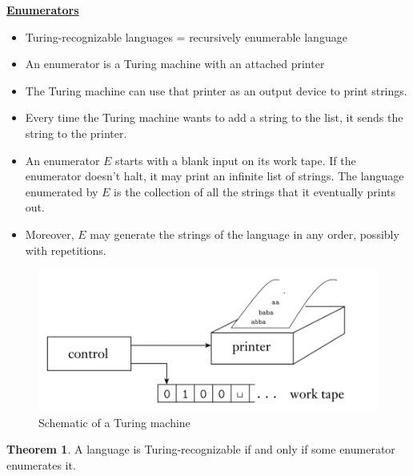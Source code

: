 \documentclass[11pt]{article}
\theoremstyle{definition}
\newtheorem{thm}{Theorem}[section]
\begin{document}
\textbf{\underline{Enumerators}}
\begin{itemize}[leftmargin=*]
    \item Turing-recognizable languages = recursively enumerable language
    \item An enumerator is a Turing machine with an attached printer
    \item The Turing machine can use that printer as an output device to print strings. 
    \item Every time the Turing machine wants to add a string to the list, it sends the string to the printer.
    \item An enumerator $E$ starts with a blank input on its work tape. If the enumerator doesn't halt, it may print an infinite list of strings. The language enumerated by $E$ is the collection of all the strings that it eventually prints out. 
    \item Moreover, $E$ may generate the strings of the language in any order, possibly with repetitions.
\end{itemize}
\begin{figure}[H]
	\centering
	\includegraphics[width=0.5\linewidth]{enum.png}
	\caption{Schematic of a Turing machine}
	\label{fig}
\end{figure}
\begin{thm}
    A language is Turing-recognizable if and only if some enumerator enumerates it.
\end{thm}
\end{document}
